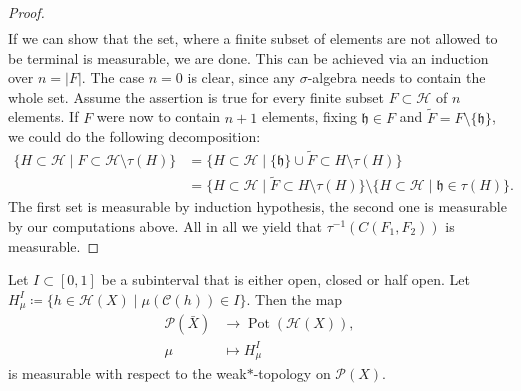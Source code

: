 \begin{proof}
\begin{align*}
  \end{align*}
  If we can show that the set, where a finite subset of elements are not allowed to be terminal is measurable, we are done. This can be achieved via an induction over \(n = |F|\). The case \(n = 0\) is clear, since any \(\sigma\)-algebra needs to contain the whole set. Assume the assertion is true for every finite subset \(F \subset \mathcal{H}\) of \(n\) elements. If \(F\) were now to contain \(n+1\) elements, fixing \(\mathfrak{h} \in F\) and \(\tilde F = F \setminus \{\mathfrak{h}\}\), we could do the following decomposition:
  \begin{align*}
    \{H \subset \mathcal{H} \mid F \subset \mathcal{H} \setminus \tau(H)\}
    & = \{H \subset \mathcal{H} \mid \{\mathfrak{h}\} \cup \tilde F \subset H \setminus \tau(H)\}\\
    & = \{H \subset \mathcal{H} \mid \tilde{F} \subset H \setminus \tau(H)\} \setminus \{H \subset \mathcal{H} \mid \mathfrak{h} \in \tau(H)\}.
  \end{align*}
  The first set is measurable by induction hypothesis, the second one is measurable by our computations above. All in all we yield that \(\tau^{-1}(C(F_1, F_2))\) is measurable.
\end{proof}


\begin{lemma}[{\cites[Lem.\ A.1]{MR3509968}}]
  \label{lem:measurable-mu}
  Let \(I \subset [0,1]\) be a subinterval that is either open, closed or half open. Let \(H^I_\mu \coloneqq \{h \in \mathcal{H}(X) \mid \mu(\mathcal{C}(h)) \in I\}\). Then the map
  \begin{align*}
    \mathcal{P}(\bar X) &\to \operatorname{Pot}(\mathcal{H}(X)),\\
    \mu &\mapsto H^I_\mu
  \end{align*}
  is measurable with respect to the weak\(\ast\)-topology on \(\mathcal{P}(X)\).
\end{lemma}

